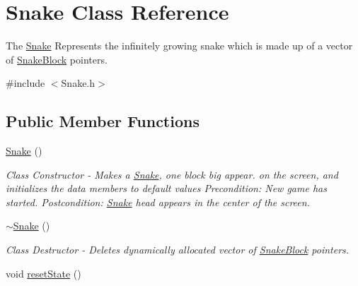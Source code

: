 \hypertarget{classSnake}{\section{\-Snake \-Class \-Reference}
\label{classSnake}
}


\-The \hyperlink{classSnake}{\-Snake} \-Represents the infinitely growing snake which is made up of a vector of \hyperlink{classSnakeBlock}{\-Snake\-Block} pointers.  




{\ttfamily \#include $<$\-Snake.\-h$>$}

\subsection*{\-Public \-Member \-Functions}
\begin{DoxyCompactItemize}
\item 
\hypertarget{classSnake_aa9cbcdb4b25d84cbf83509039cac8d01}{\hyperlink{classSnake_aa9cbcdb4b25d84cbf83509039cac8d01}{\-Snake} ()}\label{classSnake_aa9cbcdb4b25d84cbf83509039cac8d01}

\begin{DoxyCompactList}\small\item\em \-Class \-Constructor -\/ \-Makes a \hyperlink{classSnake}{\-Snake}, one block big appear. on the screen, and initializes the data members to default values \-Precondition\-: \-New game has started. \-Postcondition\-: \hyperlink{classSnake}{\-Snake} head appears in the center of the screen. \end{DoxyCompactList}\item 
\hypertarget{classSnake_a941fbaad96ee33ca3a7c30c28ca44ef8}{\hyperlink{classSnake_a941fbaad96ee33ca3a7c30c28ca44ef8}{$\sim$\-Snake} ()}\label{classSnake_a941fbaad96ee33ca3a7c30c28ca44ef8}

\begin{DoxyCompactList}\small\item\em \-Class \-Destructor -\/ \-Deletes dynamically allocated vector of \hyperlink{classSnakeBlock}{\-Snake\-Block} pointers. \end{DoxyCompactList}\item 
\hypertarget{classSnake_a8b9e117d03b8b8dd00e3ea199cdb49aa}{void \hyperlink{classSnake_a8b9e117d03b8b8dd00e3ea199cdb49aa}{reset\-State} ()}\label{classSnake_a8b9e117d03b8b8dd00e3ea199cdb49aa}


\end{DoxyCompactItemize}
